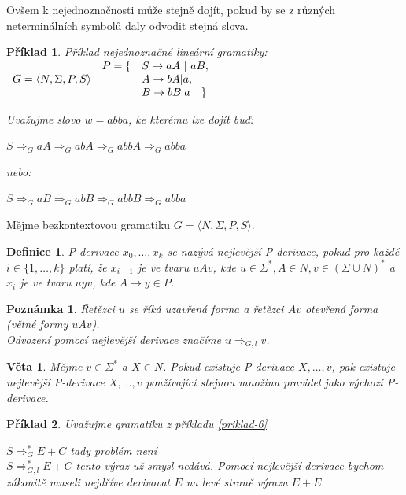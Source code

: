 \documentclass[10pt,a4paper]{article}
\theoremstyle{note}
\newtheorem{veta}{Věta}
\newtheorem{definice}{Definice}
\newtheorem{priklad}{Příklad}
\newtheorem{poznamka}{Poznámka}
\begin{document}
Ovšem k nejednoznačnosti může stejně dojít, pokud by se z různých neterminálních symbolů daly odvodit stejná slova.

\begin{priklad}
Příklad nejednoznačné lineární gramatiky: \\
$\begin{array}{l}
G=\langle N,\Sigma,P,S \rangle \\
\end{array}\\
\begin{array}{l l}
P= \lbrace &S \rightarrow aA\ |\ aB, \\
& A \rightarrow bA|a, \\
& B \rightarrow bB|a \quad \rbrace
\end{array}
$

Uvažujme slovo $w=abba$, ke kterému lze dojít buď:

$S \Rightarrow_G aA \Rightarrow_G abA \Rightarrow_G abbA \Rightarrow_G abba$

nebo:

$S \Rightarrow_G aB \Rightarrow_G abB \Rightarrow_G abbB \Rightarrow_G abba$
\end{priklad}

Mějme bezkontextovou gramatiku $G = \langle N,\Sigma,P,S \rangle$.

\begin{definice}
P-derivace $x_0,\ldots,x_k$ se nazývá \textit{nejlevější} P-derivace, pokud pro každé $i \in \lbrace 1,\ldots,k \rbrace$ platí, že $x_{i-1}$ je ve tvaru $uAv$, kde $u \in \Sigma^*,A\in N,v \in (\Sigma \cup N)^*$ a $x_i$ je ve tvaru $uyv$, kde $A \rightarrow y \in P$.
\end{definice}

\begin{poznamka}
Řetězci $u$ se říká uzavřená forma a řetězci $Av$ otevřená forma (větné formy $uAv$).\\
Odvození pomocí nejlevější derivace značíme $u \Rightarrow_{G,l} v$.
\end{poznamka}

\begin{veta}
Mějme $v \in \Sigma^*$ a $X \in N$. Pokud existuje P-derivace $X,\ldots,v$, pak existuje nejlevější P-derivace $X,\ldots,v$ používající stejnou množinu pravidel jako výchozí P-derivace.
\end{veta}

\begin{priklad}
Uvažujme gramatiku z příkladu \ref{priklad-6}

$S \Rightarrow_G^* E+C$ tady problém není\\
$S \Rightarrow_{G,l}^* E+C$ tento výraz už smysl nedává. Pomocí nejlevější derivace bychom zákonitě museli nejdříve derivovat $E$ na levé straně výrazu $E+E$
\end{priklad}
\end{document}
